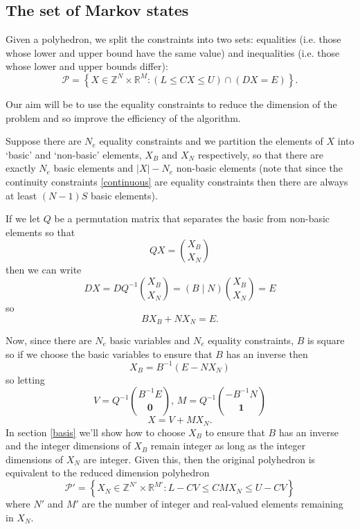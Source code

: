 \documentclass{article}
\begin{document}
\subsection{The set of Markov states}

Given a polyhedron, we split the constraints into two sets: equalities (i.e. those whose lower and upper bound have the same value) and inequalities (i.e. those whose lower and upper bounds differ):
\begin{equation}
\mathcal{P} = \left\{X \in \mathbb{Z}^N \times \mathbb{R}^M: \left(L \le CX \le U\right) \cap \left(DX = E\right) \right\}.
\label{zPolySupport}
\end{equation}

Our aim will be to use the equality constraints to reduce the dimension of the problem and so improve the efficiency of the algorithm.

Suppose there are $N_e$ equality constraints and we partition the elements of $X$ into `basic' and `non-basic' elements, $X_B$ and $X_N$ respectively, so that there are exactly $N_e$ basic elements and $|X| - N_e$ non-basic elements (note that since the continuity constraints \eqref{continuous} are equality constraints then there are always at least $(N-1)S$ basic elements).

If we let $Q$ be a permutation matrix that separates the basic from non-basic elements so that
\[
QX = {X_B \choose X_N}
\]
then we can write
\[
DX = DQ^{-1}{X_B \choose X_N} = \left(B \mid N\right){X_B \choose X_N} = E
\]
so
\begin{equation}
BX_B + NX_N = E.
\label{eqconstraints}
\end{equation}

Now, since there are $N_e$ basic variables and $N_e$ equality constraints, $B$ is square so if we choose the basic variables to ensure that $B$ has an inverse then
\begin{equation}
X_B = B^{-1}(E - NX_N)
\label{basicvars}
\end{equation}
so letting
\[
V = Q^{-1}{B^{-1}E \choose \mathbf{0}}, \, M = Q^{-1}{-B^{-1}N \choose \mathbf{1}}
\]
\begin{equation}
X = V + MX_N.
\label{markovtotrajectory}
\end{equation}
In section \ref{basis} we'll show how to choose $X_B$ to ensure that $B$ has an inverse and the integer dimensions of $X_B$ remain integer as long as the integer dimensions of $X_N$ are integer. Given this, then the original polyhedron is equivalent to the reduced dimension polyhedron
\begin{equation}
\mathcal{P}' = \left\{X_N \in \mathbb{Z}^{N'} \times \mathbb{R}^{M'}: L-CV \le  CMX_N \le U-CV\right\}
\label{reducedPolySupport}
\end{equation}
where $N'$ and $M'$ are the number of integer and real-valued elements remaining in $X_N$.
\end{document}
